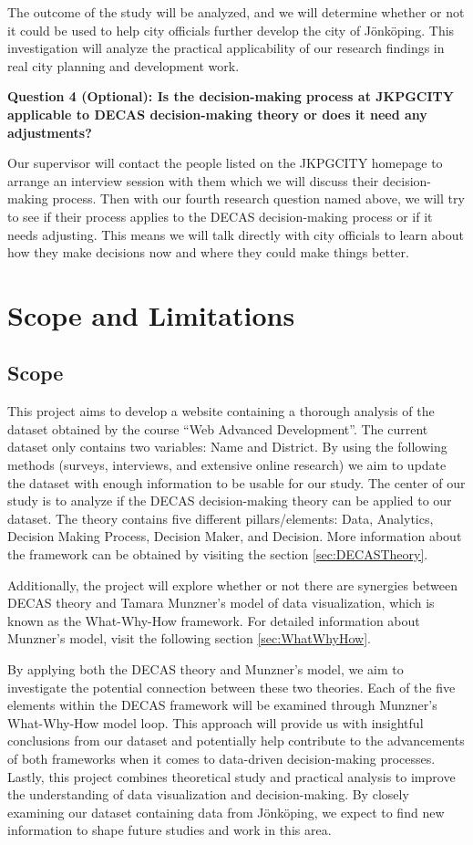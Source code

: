The outcome of the study will be analyzed, and we will determine whether or not it could be used to help city officials further develop the city of Jönköping. This investigation will analyze the practical applicability of our research findings in real city planning and development work.



\textbf{Question 4 (Optional): Is the decision-making process at JKPGCITY applicable to DECAS decision-making theory or does it need any adjustments?  }


Our supervisor will contact the people listed on the JKPGCITY homepage to arrange an interview session with them which we will discuss their decision-making process. Then with our fourth research question named above, we will try to see if their process applies to the DECAS decision-making process or if it needs adjusting. This means we will talk directly with city officials to learn about how they make decisions now and where they could make things better.




\section{Scope and Limitations}

\subsection{Scope}
This project aims to develop a website containing a thorough analysis of the dataset obtained by the course “Web Advanced Development”. The current dataset only contains two variables: Name and District. By using the following methods (surveys, interviews, and extensive online research) we aim to update the dataset with enough information to be usable for our study.
The center of our study is to analyze if the DECAS decision-making theory can be applied to our dataset. The theory contains five different pillars/elements: Data, Analytics, Decision Making Process, Decision Maker, and Decision. More information about the framework can be obtained by visiting the section \ref{sec:DECASTheory}.

Additionally, the project will explore whether or not there are synergies between DECAS theory and Tamara Munzner's model of data visualization, which is known as the What-Why-How framework. For detailed information about Munzner's model, visit the following section \ref{sec:WhatWhyHow}.

By applying both the DECAS theory and Munzner's model, we aim to investigate the potential connection between these two theories. Each of the five elements within the DECAS framework will be examined through Munzner's What-Why-How model loop. This approach will provide us with insightful conclusions from our dataset and potentially help contribute to the advancements of both frameworks when it comes to data-driven decision-making processes.
 Lastly, this project combines theoretical study and practical analysis to improve the understanding of data visualization and decision-making.  By closely examining our dataset containing data from Jönköping, we expect to find new information to shape future studies and work in this area.


